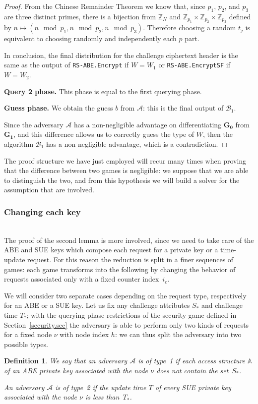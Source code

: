 \documentclass[a4paper,10pt]{article}
\newtheorem{definition}{Definition}
\newcommand{\Z}{\mathbb{Z}}
\newcommand{\algorithm}[2]{\texttt{#1.#2}}
\newcommand{\game}[2]{$\mathbf{#1_{#2}}$}
\newcommand{\phase}[1]{\textbf{#1 phase.} \hspace{0pt}}
\newcommand{\typeone}{type~1}
\newcommand{\typetwo}{type~2}
\begin{document}
\begin{proof}
	From the Chinese Remainder Theorem we know that, since $p_1$, $p_2$, and $p_3$ are three distinct primes, there is a bijection from $\Z_N$ and $\Z_{p_1}\times\Z_{p_2}\times\Z_{p_3}$ defined by $n\mapsto(n\mod p_1,n\mod p_2,n\mod p_3)$. Therefore choosing a random $t_j$ is equivalent to choosing randomly and independently each $p$ part.
	
	In conclusion, the final distribution for the challenge ciphertext header is the same as the output of \algorithm{RS-ABE}{Encrypt} if $W=W_1$ or \algorithm{RS-ABE}{EncryptSF} if $W=W_2$.
	
	\phase{Query 2}
	This phase is equal to the first querying phase.
	
	\phase{Guess}
	We obtain the guess $b$ from $\mathcal{A}$: this is the final output of $\mathscr{B}_1$.
	
	Since the adversary $\mathcal{A}$ has a non-negligible advantage on differentiating \game{G}{0} from \game{G}{1}, and this difference allows us to correctly guess the type of $W$, then the algorithm $\mathscr{B}_1$ has a non-negligible advantage, which is a contradiction.
	\end{proof}

	The proof structure we have just employed will recur many times when proving that the difference between two games is negligible: we suppose that we are able to distinguish the two, and from this hypothesis we will build a solver for the assumption that are involved.
	
	\subsubsection{Changing each key}
\ \\
	The proof of the second lemma is more involved, since we need to take care of the ABE and SUE keys which compose each request for a private key or a time-update request.	
	For this reason the reduction is split in a finer sequences of games: each game transforms into the following by changing the behavior of requests associated only with a fixed counter index~$i_c$.
	
	We will consider two separate cases depending on the request type, respectively for an ABE or a SUE key. Let us fix any challenge attributes $S_*$ and challenge time $T_*$; with the querying phase restrictions of the security game defined in Section~\ref{security.sec} the adversary is able to perform only two kinds of requests for a fixed node $\nu$ with node index $h$: we can thus split the adversary into two possible types.
	\begin{definition}
		We say that an adversary $\mathcal{A}$ is of \emph{\typeone{}} if each access structure $\mathbb{A}$ of an ABE private key associated with the node $\nu$ does not contain the set~$S_*$.
		
		An adversary $\mathcal{A}$ is of \emph{\typetwo{}} if the update time $T$ of every SUE private key associated with the node $\nu$ is less than~$T_*$.
	\end{definition}
	
\end{document}
